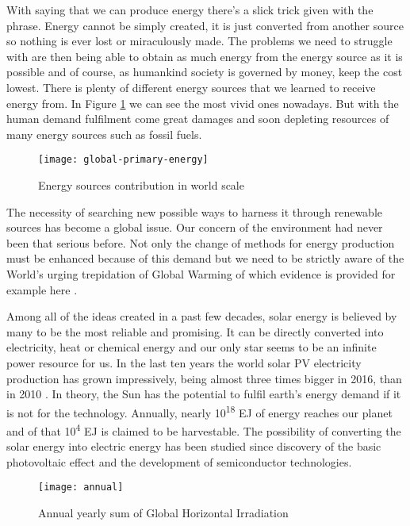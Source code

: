 With saying that we can produce energy there's a slick trick given with
the phrase. Energy cannot be simply created, it is just converted from
another source so nothing is ever lost or miraculously made. The
problems we need to struggle with are then being able to obtain as much
energy from the energy source as it is possible and of course, as
humankind society is governed by money, keep the cost lowest. There is
plenty of different energy sources that we learned to receive energy
from. In Figure \ref{fig:ensour} we can see the most vivid ones nowadays. But with
the human demand fulfilment come great damages and soon depleting
resources of many energy sources such as fossil fuels.

\begin{figure}[h]
\centering
\texttt{[image: global-primary-energy]}
\caption{Energy sources contribution in world scale
\cite{2019}}
\label{fig:ensour}
\end{figure}

The necessity of searching new possible ways to harness it through renewable sources has become a global issue. Our concern of the environment had never been that serious before. Not only the change of methods for energy production must be enhanced because of this demand but we need to be strictly aware of the World's urging trepidation of Global Warming of which evidence is provided for example here \cite{Nasa2019}.

\newpage

Among all of the ideas created in a past few decades, solar energy is
believed by many to be the most reliable and promising. It can be
directly converted into electricity, heat or chemical energy and our
only star seems to be an infinite power resource for us. In the last ten
years the world solar PV electricity production has grown impressively,
being almost three times bigger in 2016, than in 2010 \cite{2018}. In theory,
the Sun has the potential to fulfil earth's energy demand if it is not
for the technology. Annually, nearly 10\textsuperscript{18} EJ of energy
reaches our planet and of that 10\textsuperscript{4} EJ is claimed to be
harvestable. The possibility of converting the solar energy into
electric energy has been studied since discovery of the basic
photovoltaic effect and the development of semiconductor technologies.

\begin{figure}[h]
\label{fig:annual} 
\centering
\texttt{[image: annual]}
\caption{Annual yearly sum of Global Horizontal Irradiation
\cite{1991-2010}}
\end{figure}